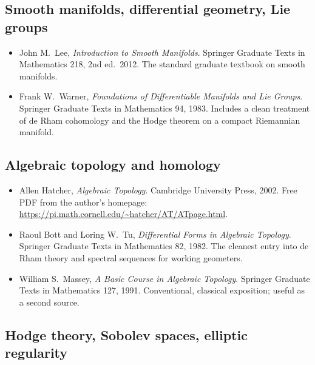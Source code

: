 \subsection*{Smooth manifolds, differential geometry, Lie groups}

\begin{itemize}
  \item John M.\ Lee, \emph{Introduction to Smooth Manifolds}.
    Springer Graduate Texts in Mathematics 218, 2nd ed.\ 2012.
    The standard graduate textbook on smooth manifolds.
  \item Frank W.\ Warner, \emph{Foundations of Differentiable
    Manifolds and Lie Groups}. Springer Graduate Texts in
    Mathematics 94, 1983. Includes a clean treatment of de Rham
    cohomology and the Hodge theorem on a compact Riemannian
    manifold.
\end{itemize}

\subsection*{Algebraic topology and homology}

\begin{itemize}
  \item Allen Hatcher, \emph{Algebraic Topology}. Cambridge
    University Press, 2002. Free PDF from the author's homepage:
    \url{https://pi.math.cornell.edu/~hatcher/AT/ATpage.html}.
  \item Raoul Bott and Loring W.\ Tu, \emph{Differential Forms in
    Algebraic Topology}. Springer Graduate Texts in Mathematics 82,
    1982. The cleanest entry into de Rham theory and spectral
    sequences for working geometers.
  \item William S.\ Massey, \emph{A Basic Course in Algebraic
    Topology}. Springer Graduate Texts in Mathematics 127, 1991.
    Conventional, classical exposition; useful as a second source.
\end{itemize}

\subsection*{Hodge theory, Sobolev spaces, elliptic regularity}

